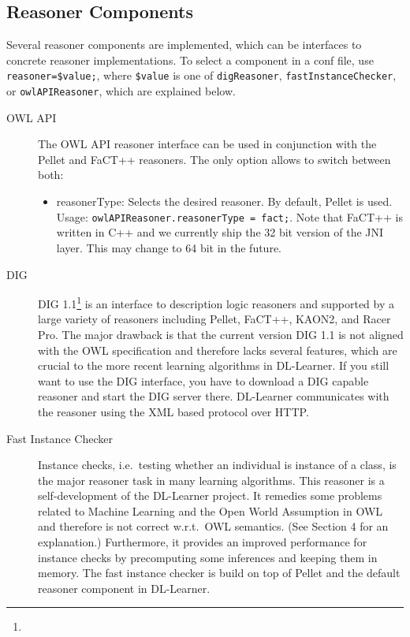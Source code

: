 \documentclass[a4paper,12pt]{scrartcl}
\begin{document}
\subsection{Reasoner Components}

Several reasoner components are implemented, which can be interfaces to concrete reasoner implementations. To select a component in a conf file, use \verb|reasoner=$value;|, where  \verb|$value| is one of \verb|digReasoner|, \verb|fastInstanceChecker|, or \verb|owlAPIReasoner|, which are explained below.

\begin{description}
 \item[OWL API] The OWL API reasoner interface can be used in conjunction with the Pellet and FaCT++ reasoners. The only option allows to switch between both:
 \begin{itemize}
  \item reasonerType: Selects the desired reasoner. By default, Pellet is used. Usage: \verb|owlAPIReasoner.reasonerType = fact;|. Note that FaCT++ is written in C++ and we currently ship the 32 bit version of the JNI layer. This may change to 64 bit in the future.
 \end{itemize}
 \item[DIG] DIG 1.1\footnote{\dig} is an interface to description logic reasoners and supported by a large variety of reasoners including Pellet, FaCT++, KAON2, and Racer Pro. The major drawback is that the current version DIG 1.1 is not aligned with the OWL specification and therefore lacks several features, which are crucial to the more recent learning algorithms in DL-Learner. If you still want to use the DIG interface, you have to download a DIG capable reasoner and start the DIG server there. DL-Learner communicates with the reasoner using the XML based protocol over HTTP.
 \item[Fast Instance Checker] Instance checks, i.e.~testing whether an individual is instance of a class, is the major reasoner task in many learning algorithms. This reasoner is a self-development of the DL-Learner project. It remedies some problems related to Machine Learning and the Open World Assumption in OWL and therefore is not correct w.r.t.~OWL semantics. (See \cite{cheng00} Section 4 for an explanation.) Furthermore, it provides an improved performance for instance checks by precomputing some inferences and keeping them in memory. The fast instance checker is build on top of Pellet and the default reasoner component in DL-Learner.
\end{description}
\end{document}
